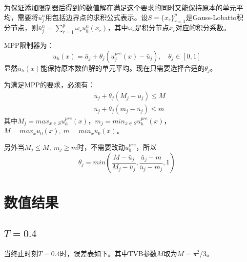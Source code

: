 \documentclass[12pt, a4paper]{ctexart}
\begin{document}
	为保证添加限制器后得到的数值解在满足这个要求的同时又能保持原本的单元平均，需要将$\bar{u}_j^n$用包括边界点的求积公式表示。设$S = \{x_r\}_{r=1}^p$是Gauss-Lobatto积分节点，则$\bar{u}_j^n = \sum_{r=1}^p \omega_r u_h^n(x_r)$，其中$\omega_r$是积分节点$x_r$对应的积分系数。
	
	MPP限制器为：
	$$
	u_h(x) = \bar{u}_j + \theta_j ( u_j^{pre}(x) - \bar{u}_j), \quad \theta_j \in [0,1]
	$$
	显然$u_h(x)$能保持原本数值解的单元平均。现在只需要选择合适的$\theta_j$。
	
	为满足MPP的要求，必须有：
	\begin{align*}
	& \bar{u}_j + \theta_j (M_j - \bar{u}_j) \leq M\\
	& \bar{u}_j + \theta_j (m_j - \bar{u}_j) \leq m
	\end{align*}
	其中$M_j = max_{x \in S} u_h^{pre}(x)$，$m_j = min_{x \in S} u_h^{pre}(x)$，$M = max_x u_0(x), \  m = min_x u_0(x)$。
	
	另外当$M_j \leq M, \  m_j \ge m$时，不需要改动$u_h^{pre}$，所以
	$$
	 \theta_j = min(\frac{M-\bar{u}_j}{M_j-\bar{u}_j}, \frac{\bar{u}_j-m}{\bar{u}_j-m_j},1 )
	$$
	
	\section{数值结果}
	
	\subsection{$T=0.4$}
	
	当终止时刻$T=0.4$时，误差表如下。其中TVB参数$M$取为$M = \pi^2/3$。
	
\end{document}
